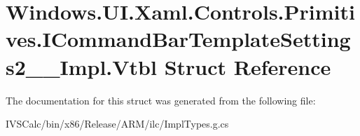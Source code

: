 \hypertarget{struct_windows_1_1_u_i_1_1_xaml_1_1_controls_1_1_primitives_1_1_i_command_bar_template_settings2_____impl_1_1_vtbl}{}\section{Windows.\+U\+I.\+Xaml.\+Controls.\+Primitives.\+I\+Command\+Bar\+Template\+Settings2\+\_\+\+\_\+\+Impl.\+Vtbl Struct Reference}
\label{struct_windows_1_1_u_i_1_1_xaml_1_1_controls_1_1_primitives_1_1_i_command_bar_template_settings2_____impl_1_1_vtbl}


The documentation for this struct was generated from the following file\+:\begin{DoxyCompactItemize}
\item 
I\+V\+S\+Calc/bin/x86/\+Release/\+A\+R\+M/ilc/Impl\+Types.\+g.\+cs\end{DoxyCompactItemize}
